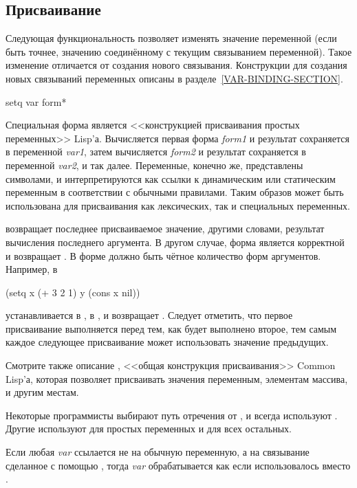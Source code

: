 \subsection{Присваивание}

Следующая функциональность позволяет изменять значение переменной (если быть
точнее, значению соединённому с текущим связыванием переменной).
Такое изменение отличается от создания нового связывания.
Конструкции для создания новых связываний переменных описаны в
разделе~\ref{VAR-BINDING-SECTION}.

\begin{defspec}
setq {var form}*

Специальная форма  является <<конструкцией присваивания простых переменных>> Lisp'а.
Вычисляется первая форма \emph{form1} и результат сохраняется в переменной
\emph{var1}, затем вычисляется \emph{form2} и результат сохраняется в переменной
\emph{var2}, и так далее.
Переменные, конечно же, представлены символами, и интерпретируются как ссылки к
динамическим или статическим переменным в соответствии с обычными правилами.
Таким образов  может быть использована для присваивания как
лексических, так и специальных переменных.

 возвращает последнее присваиваемое значение, другими словами,
результат вычисления последнего аргумента.
В другом случае, форма  является корректной и возвращает {\false}.
В форме должно быть чётное количество форм аргументов.
Например, в 
\begin{lisp}
(setq x (+ 3 2 1) y (cons x nil))
\end{lisp}
 устанавливается в ,  в , и  возвращает
. Следует отметить, что первое присваивание выполняется перед тем, как
будет выполнено второе, тем самым каждое следующее присваивание может
использовать значение предыдущих.

Смотрите также описание , <<общая конструкция
присваивания>> Common Lisp'а, которая позволяет присваивать значения переменным,
элементам массива, и другим местам.

Некоторые программисты выбирают путь отречения от , и всегда используют
. Другие используют  для простых переменных и  для
всех остальных.

Если любая \emph{var} ссылается не на обычную переменную, а на связывание
сделанное с помощью , тогда \emph{var} обрабатывается как
если  использовалось вместо .
\end{defspec}

